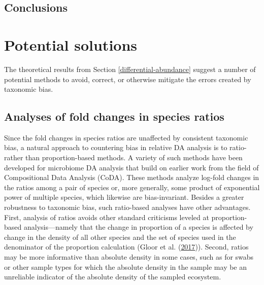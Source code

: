 \documentclass[
]{article}
\begin{document}
\hypertarget{conclusions}{%
\subsection{Conclusions}\label{conclusions}}

\hypertarget{solutions}{%
\section{Potential solutions}\label{solutions}}

The theoretical results from Section \ref{differential-abundance} suggest a number of potential methods to avoid, correct, or otherwise mitigate the errors created by taxonomic bias.

\hypertarget{analyses-of-fold-changes-in-species-ratios}{%
\subsection{Analyses of fold changes in species ratios}\label{analyses-of-fold-changes-in-species-ratios}}

Since the fold changes in species ratios are unaffected by consistent taxonomic bias, a natural approach to countering bias in relative DA analysis is to ratio- rather than proportion-based methods.
A variety of such methods have been developed for microbiome DA analysis that build on earlier work from the field of Compositional Data Analysis (CoDA).
These methods analyze log-fold changes in the ratios among a pair of species or, more generally, some product of exponential power of multiple species, which likewise are bias-invariant.
Besides a greater robustness to taxonomic bias, such ratio-based analyses have other advantages.
First, analysis of ratios avoids other standard criticisms leveled at proportion-based analysis---namely that the change in proportion of a species is affected by change in the density of all other species and the set of species used in the denominator of the proportion calculation (Gloor et al. (\protect\hyperlink{ref-gloor2017micr}{2017})).
Second, ratios may be more informative than absolute density in some cases, such as for swabs or other sample types for which the absolute density in the sample may be an unreliable indicator of the absolute density of the sampled ecosystem.
\end{document}
